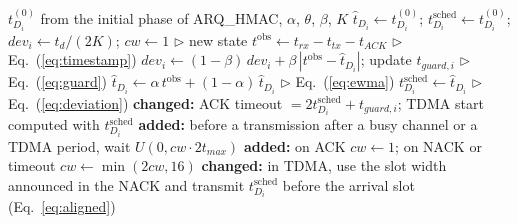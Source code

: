 \documentclass{article}
\newcommand{\COMMENTR}[1]{\hfill $\triangleright$ #1}
\begin{document}
\begin{algorithm}[H]
\caption{Changes to a sensor of ARQ\_HMAC (sensor $i$)}
\label{alg:adaptive}
\begin{algorithmic}[1]
\REQUIRE $t_{D_i}^{(0)}$ from the initial phase of ARQ\_HMAC, $\alpha$, $\theta$, $\beta$, $K$
\STATE $\hat{t}_{D_i} \leftarrow t_{D_i}^{(0)}$; \; $t_{D_i}^{\text{sched}} \leftarrow t_{D_i}^{(0)}$; \; $dev_i \leftarrow t_d/(2K)$; \; $cw \leftarrow 1$ \COMMENTR{new state}
    \STATE $t^{\text{obs}} \leftarrow t_{rx} - t_{tx} - t_{ACK}$ \COMMENTR{Eq.~(\ref{eq:timestamp})}
    \STATE $dev_i \leftarrow (1-\beta)\,dev_i + \beta\,|t^{\text{obs}} - \hat{t}_{D_i}|$; update $t_{guard,i}$ \COMMENTR{Eq.~(\ref{eq:guard})}
    \STATE $\hat{t}_{D_i} \leftarrow \alpha\, t^{\text{obs}} + (1-\alpha)\,\hat{t}_{D_i}$ \COMMENTR{Eq.~(\ref{eq:ewma})}
        \STATE $t_{D_i}^{\text{sched}} \leftarrow \hat{t}_{D_i}$ \COMMENTR{Eq.~(\ref{eq:deviation})}
    \ENDIF
\ENDFOR
\STATE \textbf{changed:} ACK timeout $= 2t_{D_i}^{\text{sched}} + t_{guard,i}$; TDMA start computed with $t_{D_i}^{\text{sched}}$
\STATE \textbf{added:} before a transmission after a busy channel or a TDMA period, wait $U(0, cw \cdot 2t_{max})$
\STATE \textbf{added:} on ACK $cw \leftarrow 1$; on NACK or timeout $cw \leftarrow \min(2cw, 16)$
\STATE \textbf{changed:} in TDMA, use the slot width announced in the NACK and transmit $t_{D_i}^{\text{sched}}$ before the arrival slot (Eq.~\ref{eq:aligned})
\end{algorithmic}
\end{algorithm}
\end{document}
